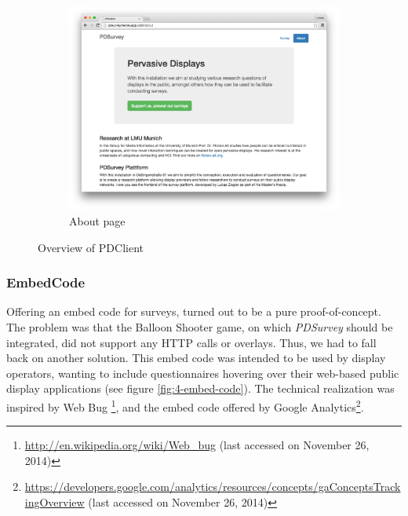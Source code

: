 \begin{figure}
		    \begin{subfigure}[b]{0.6\textwidth}
		        \centering
		        \includegraphics[width=\textwidth]{img/screenshots/pdclient/about}
		        \caption{About page}
		        \label{fig:4-pdclient-about}
		    \end{subfigure}
		    \caption{Overview of PDClient}
		    \label{fig:pdclient-screenshots}
		\end{figure}



	\subsubsection{EmbedCode}

		Offering an embed code for surveys, turned out to be a pure proof-of-concept. The problem was that the Balloon Shooter game, on which \textit{PDSurvey} should be integrated, did not support any HTTP calls or overlays. Thus, we had to fall back on another solution. This embed code was intended to be used by display operators, wanting to include questionnaires hovering over their web-based public display applications (see figure \ref{fig:4-embed-code}). The technical realization was inspired by Web Bug \footnote{\url{http://en.wikipedia.org/wiki/Web_bug} (last accessed on November 26, 2014)}, and the embed code offered by Google Analytics\footnote{\url{https://developers.google.com/analytics/resources/concepts/gaConceptsTrackingOverview} (last accessed on November 26, 2014)}.

